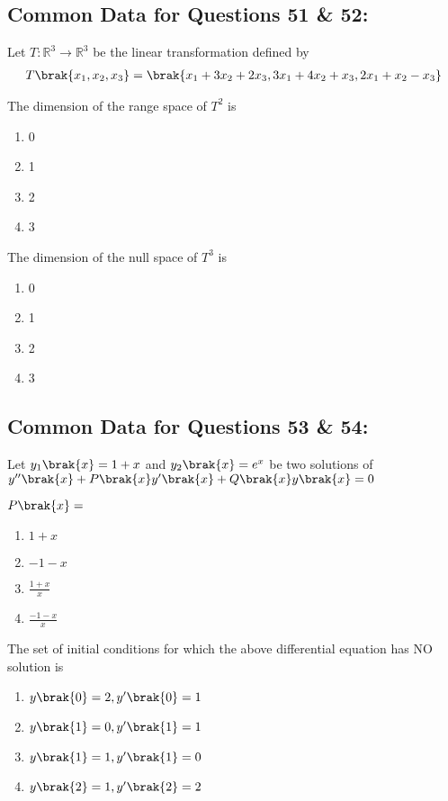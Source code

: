 \subsection*{Common Data for Questions 51 \& 52:}
Let $T \colon \mathbb{R}^3 \rightarrow \mathbb{R}^3$ be the linear transformation defined by
\begin{align*}
    T\brak{x_1, x_2, x_3} = \brak{x_1 + 3 x_2+2x_3, 3x_1 + 4x_2 + x_3, 2x_1 + x_2 - x_3}
\end{align*}
\item The dimension of the range space of $T^2$ is
\begin{multicols}{2}
    \begin{enumerate}
        \item 0
        \item 1
        \item 2
        \item 3
    \end{enumerate}
\end{multicols}
\item The dimension of the null space of $T^3$ is
\begin{multicols}{2}
    \begin{enumerate}
        \item 0
        \item 1
        \item 2
        \item 3
    \end{enumerate}
\end{multicols}

\subsection*{Common Data for Questions 53 \& 54:}
Let $y_1\brak{x} = 1+x$ and $y_2\brak{x} = e^x$ be two solutions of $y^{{\prime}{\prime}}\brak{x} + P\brak{x}y^{\prime}\brak{x} + Q\brak{x} y\brak{x} = 0$
\item $P\brak{x} = $
\begin{multicols}{2}
    \begin{enumerate}
        \item $1+x$
        \item $-1-x$
        \item $\frac{1+x}{x}$
        \item $\frac{-1-x}{x}$
    \end{enumerate}
\end{multicols}
\item The set of initial conditions for which the above differential equation has NO solution is
\begin{multicols}{2}
    \begin{enumerate}
        \item $y\brak{0} = 2, y^{\prime}\brak{0} = 1$
        \item $y\brak{1} = 0, y^{\prime}\brak{1} = 1$
        \item $y\brak{1} = 1, y^{\prime}\brak{1} = 0$
        \item $y\brak{2} = 1, y^{\prime}\brak{2} = 2$
    \end{enumerate}
\end{multicols}

